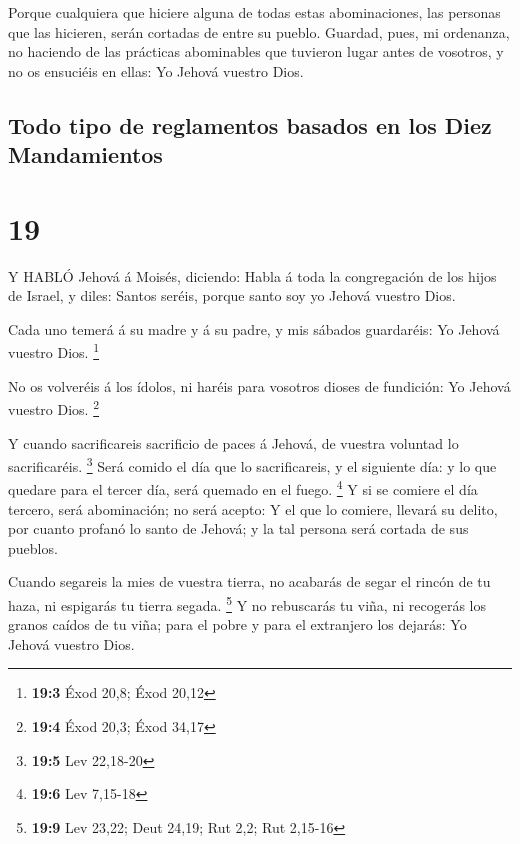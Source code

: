  Porque cualquiera que hiciere alguna de todas estas
abominaciones, las personas que las hicieren, serán cortadas de entre su
pueblo.  Guardad, pues, mi ordenanza, no haciendo de las
prácticas abominables que tuvieron lugar antes de vosotros, y no os
ensuciéis en ellas: Yo Jehová vuestro Dios.

\hypertarget{todo-tipo-de-reglamentos-basados-en-los-diez-mandamientos}{%
\subsection{Todo tipo de reglamentos basados \hspace{0pt}\hspace{0pt}en
los Diez
Mandamientos}\label{todo-tipo-de-reglamentos-basados-en-los-diez-mandamientos}}

\hypertarget{section-18}{%
\section{19}\label{section-18}}

 Y HABLÓ Jehová á Moisés, diciendo:  Habla á
toda la congregación de los hijos de Israel, y diles: Santos seréis,
porque santo soy yo Jehová vuestro Dios.

 Cada uno temerá á su madre y á su padre, y mis sábados
guardaréis: Yo Jehová vuestro Dios. \footnote{\textbf{19:3} Éxod 20,8;
  Éxod 20,12}

 No os volveréis á los ídolos, ni haréis para vosotros
dioses de fundición: Yo Jehová vuestro Dios. \footnote{\textbf{19:4}
  Éxod 20,3; Éxod 34,17}

 Y cuando sacrificareis sacrificio de paces á Jehová, de
vuestra voluntad lo sacrificaréis. \footnote{\textbf{19:5} Lev 22,18-20}
 Será comido el día que lo sacrificareis, y el siguiente
día: y lo que quedare para el tercer día, será quemado en el fuego.
\footnote{\textbf{19:6} Lev 7,15-18}  Y si se comiere el día
tercero, será abominación; no será acepto:  Y el que lo
comiere, llevará su delito, por cuanto profanó lo santo de Jehová; y la
tal persona será cortada de sus pueblos.

 Cuando segareis la mies de vuestra tierra, no acabarás de
segar el rincón de tu haza, ni espigarás tu tierra segada. \footnote{\textbf{19:9}
  Lev 23,22; Deut 24,19; Rut 2,2; Rut 2,15-16}  Y no
rebuscarás tu viña, ni recogerás los granos caídos de tu viña; para el
pobre y para el extranjero los dejarás: Yo Jehová vuestro Dios.

